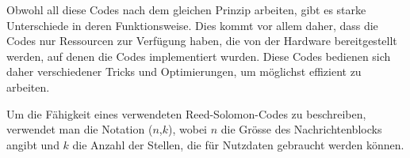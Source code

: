 Obwohl all diese Codes nach dem gleichen Prinzip arbeiten, gibt es starke Unterschiede in deren Funktionsweise. 
Dies kommt vor allem daher, dass die Codes nur Ressourcen zur Verfügung haben, die von der Hardware bereitgestellt werden, auf denen die Codes implementiert wurden.
Diese Codes bedienen sich daher verschiedener Tricks und Optimierungen, um möglichst effizient zu arbeiten.

Um die Fähigkeit eines verwendeten Reed-Solomon-Codes zu beschreiben, verwendet man die Notation ($n$,$k$), wobei $n$ die Grösse des Nachrichtenblocks angibt und $k$ die Anzahl der Stellen, die für Nutzdaten gebraucht werden können.

%
%
%
%
%
%
%
%
%
%
%
%
%

